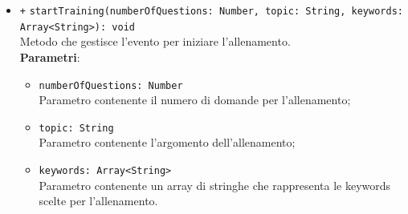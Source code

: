 \begin{itemize}
\begin{itemize}
\begin{itemize}
		\end{itemize}
		\item \texttt{+} \texttt{startTraining(numberOfQuestions: Number, topic: String, keywords: Array<String>): void} \\
		Metodo che gestisce l'evento per iniziare l'allenamento. \\
		\textbf{Parametri}:
		\begin{itemize}
			\item \texttt{numberOfQuestions: Number} \\
			Parametro contenente il numero di domande per l'allenamento;
			\item \texttt{topic: String} \\
			Parametro contenente l'argomento dell'allenamento;
			\item \texttt{keywords: Array<String>} \\
			Parametro contenente un array di stringhe che rappresenta le keywords scelte per l'allenamento.
		\end{itemize}
	\end{itemize}
\end{itemize}

